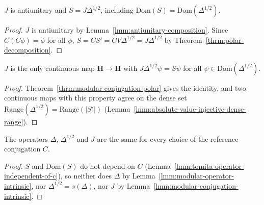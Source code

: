 \begin{theorem}[$S = J\Delta^{1/2}$]
    \label{thrm:modular-conjugation-polar}
    \leanok
    $J$ is antiunitary and $S = J\Delta^{1/2}$, including $\text{Dom}(S) = \text{Dom}(\Delta^{1/2})$.
\end{theorem}
\begin{proof}
    \leanok
    $J$ is antiunitary by Lemma~\ref{lmm:antiunitary-composition}. Since $C(C\phi) = \phi$ for all $\phi$, $S = CS' = CV\Delta^{1/2} = J\Delta^{1/2}$ by Theorem~\ref{thrm:polar-decomposition}.
\end{proof}

\begin{lemma}
    \label{lmm:modular-conjugation-intrinsic}
    \leanok
    $J$ is the only continuous map $\mathbf{H} \to \mathbf{H}$ with $J\Delta^{1/2}\psi = S\psi$ for all $\psi \in \text{Dom}(\Delta^{1/2})$.
\end{lemma}
\begin{proof}
    \leanok
    Theorem~\ref{thrm:modular-conjugation-polar} gives the identity, and two continuous maps with this property agree on the dense set $\text{Range}(\Delta^{1/2}) = \text{Range}(|S'|)$ (Lemma~\ref{lmm:absolute-value-injective-dense-range}).
\end{proof}

\begin{theorem}
    \label{thrm:modular-objects-independent-of-c}
    \leanok
    The operators $\Delta$, $\Delta^{1/2}$ and $J$ are the same for every choice of the reference conjugation $C$.
\end{theorem}
\begin{proof}
    \leanok
    $S$ and $\text{Dom}(S)$ do not depend on $C$ (Lemma~\ref{lmm:tomita-operator-independent-of-c}), so neither does $\Delta$ by Lemma~\ref{lmm:modular-operator-intrinsic}, nor $\Delta^{1/2} = s(\Delta)$, nor $J$ by Lemma~\ref{lmm:modular-conjugation-intrinsic}.
\end{proof}

